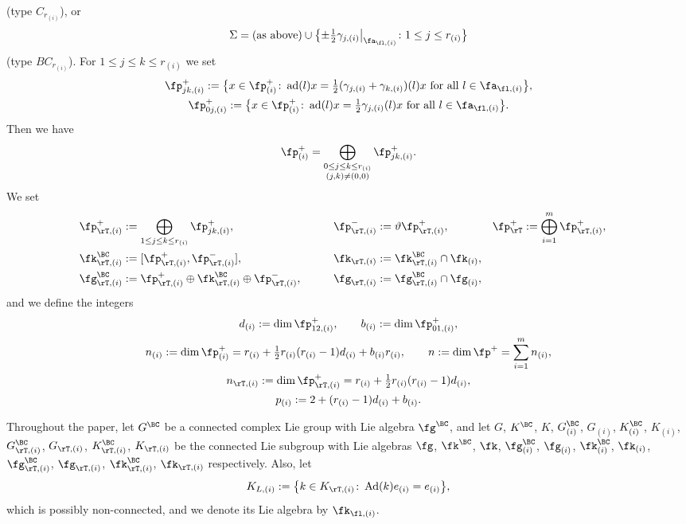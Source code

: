 (type $C_{r_{(i)}}$), or
\begin{gather*} \Sigma=(\text{as above})\cup\big\{ {\pm}\tfrac{1}{2}\gamma_{j,(i)}\big|_{\fa_{\fl,(i)}}\colon 1\le j\le r_{(i)}\big\} \end{gather*}
(type $BC_{r_{(i)}}$). For $1\le j\le k\le r_{(i)}$ we set
\begin{gather*}
\fp^+_{jk,(i)} :=\big\{x\in\fp^+_{(i)}\colon \operatorname{ad}(l)x=\tfrac{1}{2}(\gamma_{j,(i)}+\gamma_{k,(i)})(l)x\text{ for all }l\in\fa_{\fl,(i)}\big\},\\
\fp^+_{0j,(i)} :=\big\{x\in\fp^+_{(i)}\colon \operatorname{ad}(l)x=\tfrac{1}{2}\gamma_{j,(i)}(l)x\text{ for all } l\in\fa_{\fl,(i)}\big\}.
\end{gather*}
Then we have
\begin{gather*} \fp^+_{(i)}=\bigoplus_{\substack{0\le j\le k\le r_{(i)}\\ (j,k)\ne (0,0)}}\fp^+_{jk,(i)}. \end{gather*}
We set
\begin{alignat*}{4}
&\fp^+_{\rT,(i)}:=\bigoplus_{1\le j\le k\le r_{(i)}}\fp^+_{jk,(i)},\qquad &&
\fp^-_{\rT,(i)}:=\vartheta\fp^+_{\rT,(i)},\qquad &&
\fp^+_{\rT}:=\bigoplus_{i=1}^m \fp^+_{\rT,(i)}, &\\
&\fk^\BC_{\rT,(i)}:=[\fp^+_{\rT,(i)},\fp^-_{\rT,(i)}], \qquad && \fk_{\rT,(i)} :=\fk^\BC_{\rT,(i)}\cap \fk_{(i)}, &&&\\
& \fg^\BC_{\rT,(i)}:=\fp^+_{\rT,(i)}\oplus \fk^\BC_{\rT,(i)}\oplus \fp^-_{\rT,(i)},\qquad && \fg_{\rT,(i)}:=\fg^\BC_{\rT,(i)}\cap \fg_{(i)},&&&
\end{alignat*}
and we define the integers
\begin{gather*}
d_{(i)} :=\dim\fp^+_{12,(i)},\qquad b_{(i)}:=\dim\fp^+_{01,(i)},\\
n_{(i)}:=\dim\fp^+_{(i)}=r_{(i)}+\tfrac{1}{2}r_{(i)}(r_{(i)}-1)d_{(i)}+b_{(i)}r_{(i)},\qquad
n:=\dim\fp^+=\sum_{i=1}^m n_{(i)},\\
n_{\rT,(i)}:=\dim\fp^+_{\rT,(i)}=r_{(i)}+\tfrac{1}{2}r_{(i)}(r_{(i)}-1)d_{(i)},\\
p_{(i)}:=2+(r_{(i)}-1)d_{(i)}+b_{(i)}.
\end{gather*}

Throughout the paper, let $G^\BC$ be a connected complex Lie group with Lie algebra $\fg^\BC$, and let
$G$, $K^\BC$, $K$, $G^\BC_{(i)}$, $G_{(i)}$, $K^\BC_{(i)}$, $K_{(i)}$, $G^\BC_{\rT,(i)}$, $G_{\rT,(i)}$, $K^\BC_{\rT,(i)}$, $K_{\rT,(i)}$
be the connected Lie subgroup with Lie algebras
$\fg$, $\fk^\BC$, $\fk$, $\fg^\BC_{(i)}$, $\fg_{(i)}$, $\fk^\BC_{(i)}$, $\fk_{(i)}$,
$\fg^\BC_{\rT,(i)}$, $\fg_{\rT,(i)}$, $\fk^\BC_{\rT,(i)}$, $\fk_{\rT,(i)}$ respectively.
Also, let
\begin{gather*} K_{L,(i)}:=\big\{ k\in K_{\rT,(i)}\colon \operatorname{Ad}(k)e_{(i)}=e_{(i)}\big\}, \end{gather*}
which is possibly non-connected, and we denote its Lie algebra by $\fk_{\fl,(i)}$.

